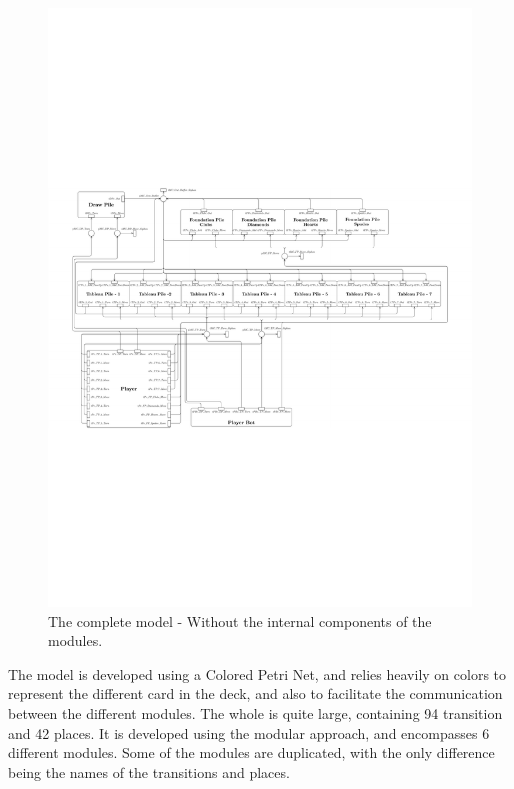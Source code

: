 \documentclass[runningheads,a4paper]{llncs}
\begin{document}
\begin{figure}
	\begin{center} %
		\includegraphics[trim=250 260 230 330,scale=1.1]{images/overallViewPdf}
		\caption{The complete model - Without the internal components of the modules.}
		\label{fig:full_horizontal}
	\end{center}
\end{figure}


The model is developed using a Colored Petri Net, and relies heavily on colors to represent the different card in the deck, and also to facilitate the communication between the different modules. The whole is quite large, containing 94 transition and 42 places. It is developed using the modular approach, and encompasses 6 different modules. Some of the modules are duplicated, with the only difference being the names of the transitions and places.
\clearpage
\end{document}
